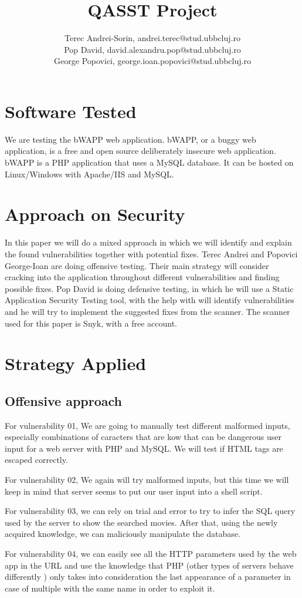 \documentclass{article}
\title{\textbf{QASST Project}}
\author{Terec Andrei-Sorin, andrei.terec@stud.ubbcluj.ro\\
Pop David, david.alexandru.pop@stud.ubbcluj.ro\\
George Popovici, george.ioan.popovici@stud.ubbcluj.ro}
\begin{document}
\maketitle


\tableofcontents

\newpage

\section{Software Tested}
\label{label:Software_tested}

We are testing the bWAPP web application.
bWAPP, or a buggy web application, is a free and open source deliberately insecure web application.
bWAPP is a PHP application that uses a MySQL database. It can be hosted on Linux/Windows with Apache/IIS and MySQL.

\section{Approach on Security}
\label{}

In this paper we will do a mixed approach in which we will identify and explain the found vulnerabilities together with potential fixes.
Terec Andrei and Popovici George-Ioan are doing offensive testing. Their main strategy will consider cracking into the application throughout different vulnerabilities and finding possible fixes. Pop David is doing defensive testing, in which he will use a Static Application Security Testing tool, with the help with will identify vulnerabilities and he will try to implement the suggested fixes from the scanner. The scanner used for this paper is Snyk, with a free account.

\section{Strategy Applied}
\label{}

\subsection{Offensive approach}
\par For vulnerability 01, We are going to manually test different malformed inputs, especially combinations of caracters that are kow that can be dangerous user input for a web server with PHP and MySQL. We will test if HTML tags are escaped correctly.
\par For vulnerability 02, We again will try malformed inputs, but this time we will keep in mind that server seems to put our user input into a shell script.
\par For vulnerability 03, we can rely on trial and error to try to infer the SQL query used by the server to show the searched movies. After that, using the newly acquired knowledge, we can maliciously manipulate the database.
\par For vulnerability 04, we can easily see all the HTTP parameters used by the web app in the URL and use the knowledge that PHP (other types of servers behave differently \cite{vul:httppp-extra}) only takes into consideration the last appearance of a parameter in case of multiple with the same name in order to exploit it.
\end{document}
